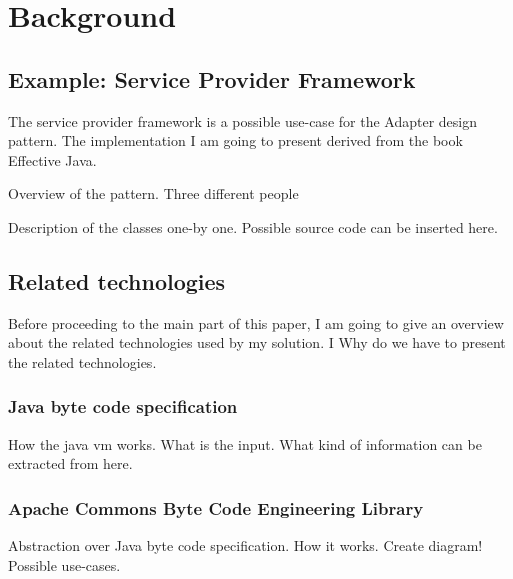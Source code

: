 \chapter{Background}

\section{Example: Service Provider Framework}
\label{sect:example}

The service provider framework is a possible use-case for the Adapter design pattern. The implementation I am going to present derived from the book \cite{Bloch08} Effective Java.

Overview of the pattern. 
Three different people 

Description of the classes one-by one. Possible source code can be inserted here. 


\section{Related technologies}
Before proceeding to the main part of this paper, I am going to give an overview about the related technologies used by my solution. I
Why do we have to present the related technologies. 


\subsection{Java byte code specification}
How the java vm works.
What is the input. 
What kind of information can be extracted from here. 


\subsection{Apache Commons Byte Code Engineering Library}
\cite{BCEL}
Abstraction over Java byte code specification. 
How it works. Create diagram!
Possible use-cases.


